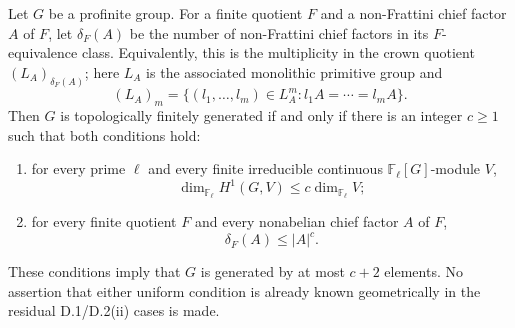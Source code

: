 \begin{proposition}
\label{D:cohomology-crown-criterion}
Let $G$ be a profinite group.  For a finite quotient $F$ and a
non-Frattini chief factor $A$ of $F$, let $\delta_F(A)$ be the
number of non-Frattini chief factors in its $F$-equivalence
class.  Equivalently, this is the multiplicity in the crown
quotient $(L_A)_{\delta_F(A)}$; here $L_A$ is the associated
monolithic primitive group and
\[
 (L_A)_m=\{(l_1,\ldots,l_m)\in L_A^m:
                 l_1A=\cdots=l_mA\}.
\]
Then $G$ is topologically finitely generated if and only if
there is an integer $c\geq1$ such that both conditions hold:
\begin{enumerate}
\item for every prime $\ell$ and every finite irreducible
continuous $\mathbb F_\ell[G]$-module $V$,
\[
 \dim_{\mathbb F_\ell}H^1(G,V)
       \leq c\dim_{\mathbb F_\ell}V;
\]
\item for every finite quotient $F$ and every nonabelian
chief factor $A$ of $F$,
\[
 \delta_F(A)\leq |A|^c.
\]
\end{enumerate}
These conditions imply that $G$ is generated by at most $c+2$
elements.  No assertion that either uniform condition is already
known geometrically in the residual D.1/D.2(ii) cases is made.
\end{proposition}
